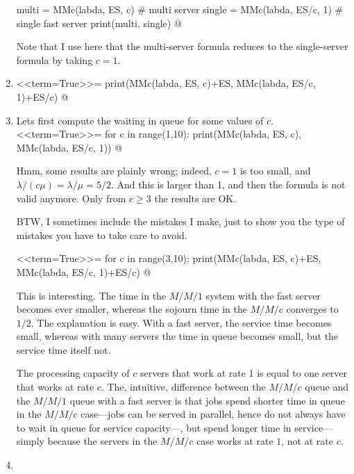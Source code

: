 \begin{question}
\begin{solution}
\begin{enumerate}
multi  = MMc(labda, ES, c) # multi server
single  = MMc(labda, ES/c, 1) # single fast server
print(multi, single)
@

Note that I use here that the multi-server formula reduces to the
single-server formula by taking $c=1$. 

\item 

<<term=True>>=
print(MMc(labda, ES, c)+ES, MMc(labda, ES/c, 1)+ES/c)
@

\item
Lets first compute the waiting in queue for some values of $c$.
<<term=True>>=
for c in range(1,10):
    print(MMc(labda, ES, c), MMc(labda, ES/c, 1))
@   

Hmm, some results are plainly wrong; indeed, $c=1$ is too small, and
$\lambda/(c\mu) = \lambda/\mu = 5/2$. And this is larger than 1, and
then the formula is not valid anymore. Only from $c\geq 3$ the results
are OK.

BTW, I sometimes include the mistakes I make, just to show you the
type of mistakes you have to take care to avoid. 


<<term=True>>=
for c in range(3,10):
    print(MMc(labda, ES, c)+ES, MMc(labda, ES/c, 1)+ES/c)
@

This is interesting. The time in the $M/M/1$ system with the fast
server becomes ever smaller, whereas the sojourn time in the $M/M/c$
converges to $1/2$. The explanation is easy. With a fast server, the
service time becomes small, whereas with many servers the time in
queue becomes small, but the service time itself not.

The processing capacity of $c$ servers that work at rate 1 is equal to
one server that works at rate $c$. The, intuitive, difference between
the $M/M/c$ queue and the $M/M/1$ queue with a fast server is that
jobs spend shorter time in queue in the $M/M/c$ case---jobs can be
served in parallel, hence do not always have to wait in queue for
service capacity---, but spend longer time in service---simply because
the servers in the $M/M/c$ case works at rate $1$, not at rate $c$.

\item 


\end{enumerate}
\end{solution}
\end{question}

